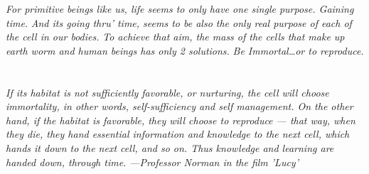 \textit{For primitive beings like us, life seems to only have one single purpose. Gaining time.}
\textit{And its going thru’ time, seems to be also the only real purpose of each of the cell in our bodies.}
\textit{To achieve that aim, the mass of the cells that make up earth worm and human beings has only 2 solutions.}
\textit{Be Immortal…or to reproduce.}
\section{}
\textit{If its habitat is not sufficiently favorable, or nurturing, the cell will choose immortality, in other words, self-sufficiency and self management. On the other hand, if the habitat is favorable, they will choose to reproduce — that way, when they die, they hand essential information and knowledge to the next cell, which hands it down to the next cell, and so on. Thus knowledge and learning are handed down, through time.}
\textit{---Professor Norman in the film 'Lucy'}